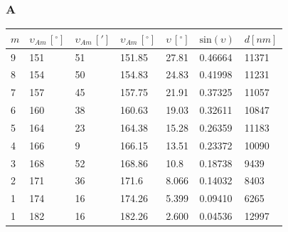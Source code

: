 \documentclass[a4paper, 11pt]{article}
\begin{document}
\subsubsection{A}\label{sec:a} %
\begin{center}
	\begin{tabular}{|l|l|l|l|l|l|l|}
		\hline
		$m $ & $\upsilon_{Am} \, [^{\circ}]$ & $\upsilon_{Am} \, [']$ & $\upsilon_{Am} \, [^{\circ}]$ & $\upsilon \, [^{\circ}]$ & $\text{sin}(\upsilon)$ & $d [nm]$ \\ \hline
		9    & 151                           & 51                     & 151.85                        & 27.81                    & 0.46664                & 11371    \\ \hline
		8    & 154                           & 50                     & 154.83                        & 24.83                    & 0.41998                & 11231    \\ \hline
		7    & 157                           & 45                     & 157.75                        & 21.91                    & 0.37325                & 11057    \\ \hline
		6    & 160                           & 38                     & 160.63                        & 19.03                    & 0.32611                & 10847    \\ \hline
		5    & 164                           & 23                     & 164.38                        & 15.28                    & 0.26359                & 11183    \\ \hline
		4    & 166                           & 9                      & 166.15                        & 13.51                    & 0.23372                & 10090    \\ \hline
		3    & 168                           & 52                     & 168.86                        & 10.8                     & 0.18738                & 9439     \\ \hline
		2    & 171                           & 36                     & 171.6                         & 8.066                    & 0.14032                & 8403     \\ \hline
		1    & 174                           & 16                     & 174.26                        & 5.399                    & 0.09410                & 6265     \\ \hline
		1    & 182                           & 16                     & 182.26                        & 2.600                    & 0.04536                & 12997    \\ \hline

\end{tabular}
\end{center}
\end{document}
